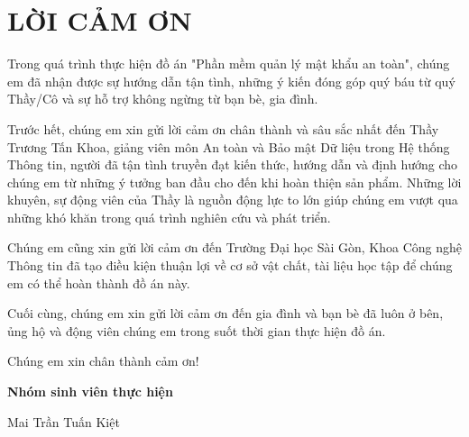 \chapter*{LỜI CẢM ƠN}

Trong quá trình thực hiện đồ án "Phần mềm quản lý mật khẩu an toàn", chúng em đã nhận được sự hướng dẫn tận tình, những ý kiến đóng góp quý báu từ quý Thầy/Cô và sự hỗ trợ không ngừng từ bạn bè, gia đình.

Trước hết, chúng em xin gửi lời cảm ơn chân thành và sâu sắc nhất đến Thầy Trương Tấn Khoa, giảng viên môn An toàn và Bảo mật Dữ liệu trong Hệ thống Thông tin, người đã tận tình truyền đạt kiến thức, hướng dẫn và định hướng cho chúng em từ những ý tưởng ban đầu cho đến khi hoàn thiện sản phẩm. Những lời khuyên, sự động viên của Thầy là nguồn động lực to lớn giúp chúng em vượt qua những khó khăn trong quá trình nghiên cứu và phát triển.

Chúng em cũng xin gửi lời cảm ơn đến Trường Đại học Sài Gòn, Khoa Công nghệ Thông tin đã tạo điều kiện thuận lợi về cơ sở vật chất, tài liệu học tập để chúng em có thể hoàn thành đồ án này.

Cuối cùng, chúng em xin gửi lời cảm ơn đến gia đình và bạn bè đã luôn ở bên, ủng hộ và động viên chúng em trong suốt thời gian thực hiện đồ án.

Chúng em xin chân thành cảm ơn!

\vspace{1cm}
\begin{flushright}
\textbf{Nhóm sinh viên thực hiện}\par
Mai Trần Tuấn Kiệt\par
\end{flushright}
\newpage